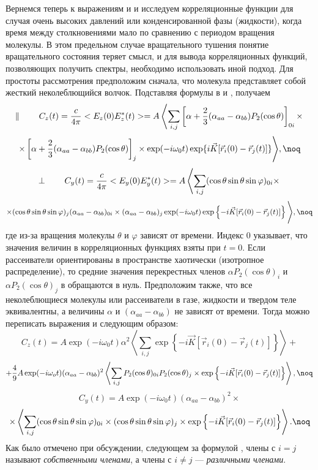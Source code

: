 {Вернемся теперь к выражениям  и  и исследуем
корреляционные функции для случая очень высоких давлений или
конденсированной фазы (жидкости), когда время между
столкновениями мало по сравнению с периодом вращения молекулы. В
этом предельном случае вращательного тушения понятие
вращательного состояния теряет смысл, и для вывода корреляционных
функций, позволяющих получить спектры, необходимо использовать
иной подход. Для простоты рассмотрения предположим сначала, что
молекула представляет собой жесткий неколеблющийся волчок.
Подставляя формулы  в  и , получаем
$$\parallel\hskip 7 true mm
C_z(t)={c\over4\pi}<E_z(0)E_z^*(t)>=A\left<\sum\limits_{i,j}\left[\alpha+{2\over3}
(\alpha_{aa}-\alpha_{bb})P_2(\cos\theta)\right]_{0i}\times\right.$$$$\times\left[\alpha+{2\over3}
(\alpha_{aa}-\alpha_{bb})P_2(\cos\theta)\right]_j\times\exp(-i\omega_0t)\exp\{i\vec
K[\vec r_i(0)-\vec r_j(t)]\}\Bigg>,\noq$$
$$\perp\hskip 7 true mm
C_y(t)={c\over4\pi}<E_y(0)E_y^*(t)>=A\left<
\sum\limits_{i,j}(\cos\theta\sin\theta\sin\varphi)_{0i}\times\right.$$$$\times(\cos\theta\sin\theta
\sin\varphi)_j(\alpha_{aa}-\alpha_{bb})_{0i}\times
(\alpha_{aa}-\alpha_{bb})_j\exp(-i\omega_0t)\exp\left\{-i\vec K[\vec
r_i(0)-\vec r_j(t)]\right\}\Bigg>,\noq$$
где из-за вращения молекулы $\theta$ и $\varphi$ зависят от времени.
Индекс 0 указывает, что значения величин в
корреляционных функциях взяты при $t=0$. Если рассеиватели
ориентированы в пространстве хаотически (изотропное
распределение), то средние значения перекрестных членов $\alpha
P_2(\cos\theta)_i$ и $\alpha P_2(\cos\theta)_j$ в 
обращаются в нуль. Предположим также, что все неколеблющиеся
молекулы или рассеиватели в газе, жидкости и твердом теле эквивалентны, а величины
$\alpha$ и $(\alpha_{aa}-\alpha_{bb})$ не зависят от времени.
Тогда можно переписать выражения  и  следующим образом:
$$C_z(t)=A\exp(-i\omega_0t)\alpha^2\left<\sum\limits_{i,j}\exp\left\{
-i\vec K[\vec r_i(0)-\vec r_j(t)]\right\}\right>+$$$$+{4\over9}A
\exp(-i\omega_ot)(\alpha_{aa}-\alpha_{bb})^2\left<\sum\limits_{i,j}P_2(\cos\theta)_{0i}P_2(\cos\theta)_j\times
\exp\left\{-i\vec K[\vec r_i(0)-\vec r_j(t)]\right\}\right>,\noq$$
$$C_y(t)=A\exp(-i\omega_0t)(\alpha_{aa}-\alpha_{bb})^2\times$$$$\times\left<\sum\limits_{i,j}
(\cos\theta\sin\theta\sin\varphi)_{0i}\times(\cos\theta\sin\theta\sin\varphi)_j
\times\exp\left\{-i\vec K[\vec r_i(0)-\vec
r_j(t)]\right\}\right>.\noq$$
Как было отмечено при обсуждении, следующем за формулой ,
члены с $i=j$ называют {\it собственными членами}, а члены с
$i\not=j$ --- {\it различными членами}.
}
